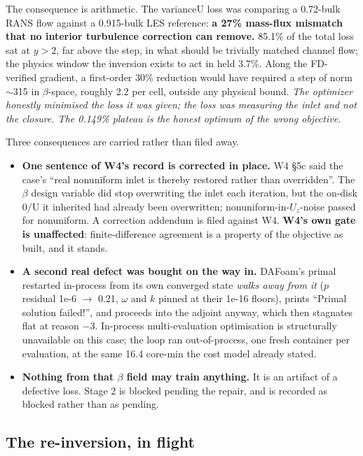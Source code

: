 \documentclass[11pt,a4paper]{article}
\newcommand{\breakus}{\textunderscore\allowbreak}
\newcommand{\code}[1]{{\small\ttfamily\let\_\breakus #1}}
\begin{document}
The consequence is arithmetic. The \code{varianceU} loss was comparing a 0.72-bulk RANS
flow against a 0.915-bulk LES reference: \textbf{a 27\% mass-flux mismatch that no interior
turbulence correction can remove.} 85.1\% of the total loss sat at $y > 2$, far above the
step, in what should be trivially matched channel flow; the physics window the inversion
exists to act in held 3.7\%. Along the FD-verified gradient, a first-order 30\% reduction
would have required a step of norm $\sim$315 in $\beta$-space, roughly 2.2 per cell,
outside any physical bound. \emph{The optimizer honestly minimised the loss it was given;
the loss was measuring the inlet and not the closure. The 0.149\% plateau is the honest
optimum of the wrong objective.}

Three consequences are carried rather than filed away.

\begin{itemize}
\item \textbf{One sentence of W4's record is corrected in place.} W4 \S5c said the case's
  ``real nonuniform inlet is thereby restored rather than overridden''. The $\beta$ design
  variable did stop overwriting the inlet each iteration, but the on-disk \code{0/U} it
  inherited had already been overwritten; nonuniform-in-$U_z$-noise passed for nonuniform.
  A correction addendum is filed against W4. \textbf{W4's own gate is unaffected}:
  finite-difference agreement is a property of the objective as built, and it stands.
\item \textbf{A second real defect was bought on the way in.} DAFoam's primal restarted
  in-process from its own converged state \emph{walks away from it} ($p$ residual 1e-6
  $\rightarrow$ 0.21, $\omega$ and $k$ pinned at their 1e-16 floors), prints ``Primal
  solution failed!'', and proceeds into the adjoint anyway, which then stagnates flat at
  reason $-3$. In-process multi-evaluation optimisation is structurally unavailable on this
  case; the loop ran out-of-process, one fresh container per evaluation, at the same
  16.4 core-min the cost model already stated.
\item \textbf{Nothing from that $\beta$ field may train anything.} It is an artifact of a
  defective loss. Stage 2 is blocked pending the repair, and is recorded as blocked rather
  than as pending.
\end{itemize}

\subsection{The re-inversion, in flight}
\label{sec:reinversion}
\end{document}
